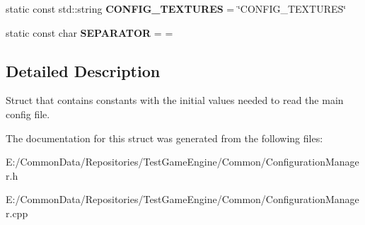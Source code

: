 \begin{DoxyCompactItemize}
\item 
\mbox{\label{struct_configuration_1_1_configuration_manager_constants_a4539db1d25f350008afcde16ec08b4f9}} 
static const std\+::string {\bfseries C\+O\+N\+F\+I\+G\+\_\+\+T\+E\+X\+T\+U\+R\+ES} = \char`\"{}C\+O\+N\+F\+I\+G\+\_\+\+T\+E\+X\+T\+U\+R\+ES\char`\"{}
\item 
\mbox{\label{struct_configuration_1_1_configuration_manager_constants_a4793b7b9e9e52a28d46312f57652471e}} 
static const char {\bfseries S\+E\+P\+A\+R\+A\+T\+OR} = \textquotesingle{}=\textquotesingle{}
\end{DoxyCompactItemize}


\subsection{Detailed Description}
Struct that contains constants with the initial values needed to read the main config file. 

The documentation for this struct was generated from the following files\+:\begin{DoxyCompactItemize}
\item 
E\+:/\+Common\+Data/\+Repositories/\+Test\+Game\+Engine/\+Common/Configuration\+Manager.\+h\item 
E\+:/\+Common\+Data/\+Repositories/\+Test\+Game\+Engine/\+Common/Configuration\+Manager.\+cpp\end{DoxyCompactItemize}
